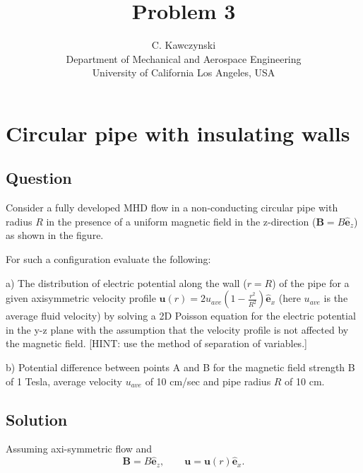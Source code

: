 \documentclass[11pt]{article}
\newcommand{\B}{\mathbf{B}}
\newcommand{\U}{\mathbf{u}}
\newcommand{\E}{\mathbf{\hat{e}}}
\begin{document}
\doublespacing
\title{Problem 3}
\author{C. Kawczynski \\
Department of Mechanical and Aerospace Engineering \\
University of California Los Angeles, USA\\
}
\maketitle

\section{Circular pipe with insulating walls}
\subsection{Question}
Consider a fully developed MHD flow in a non-conducting circular pipe with radius $R$ in the presence of a uniform magnetic field in the z-direction ($\B = B \E_z$) as shown in the figure.

For such a configuration evaluate the following:

a) The distribution of electric potential along the wall ($r=R$) of the pipe for a given axisymmetric velocity profile $\U(r) = 2 u_{ave} \left( 1 - \frac{r^2}{R^2} \right) \E_x$ (here $u_{ave}$ is the average fluid velocity) by solving a 2D Poisson equation for the electric potential in the y-z plane with the assumption that the velocity profile is not affected by the magnetic field. [HINT: use the method of separation of variables.]

b) Potential difference between points A and B for the magnetic field strength B of 1 Tesla, average velocity $u_{ave}$ of 10 cm/sec and pipe radius $R$ of 10 cm.

\subsection{Solution}
Assuming axi-symmetric flow and
\begin{equation}
	\B = B \E_z
	, \qquad
	\U = \U(r) \E_x.
\end{equation}
\end{document}
